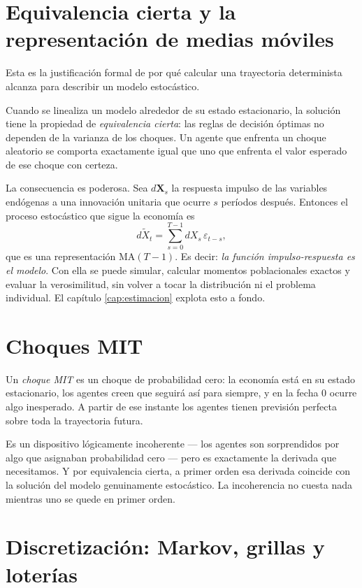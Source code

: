 \section{Equivalencia cierta y la representación de medias móviles}

Esta es la justificación formal de por qué calcular una trayectoria determinista
alcanza para describir un modelo estocástico.

Cuando se linealiza un modelo alrededor de su estado estacionario, la solución
tiene la propiedad de \emph{equivalencia cierta}: las reglas de decisión óptimas
no dependen de la varianza de los choques. Un agente que enfrenta un choque
aleatorio se comporta exactamente igual que uno que enfrenta el valor esperado
de ese choque con certeza.

La consecuencia es poderosa. Sea $d\mathbf{X}_s$ la respuesta impulso de las
variables endógenas a una innovación unitaria que ocurre $s$ períodos después.
Entonces el proceso estocástico que sigue la economía es
\begin{equation}
d\tilde{X}_t = \sum_{s=0}^{T-1} d X_s\, \varepsilon_{t-s},
\label{eq:ma}
\end{equation}
que es una representación $\mathrm{MA}(T-1)$. Es decir: \emph{la función
impulso-respuesta es el modelo}. Con ella se puede simular, calcular momentos
poblacionales exactos y evaluar la verosimilitud, sin volver a tocar la
distribución ni el problema individual. El capítulo \ref{cap:estimacion}
explota esto a fondo.

\section{Choques MIT}

Un \emph{choque MIT} es un choque de probabilidad cero: la economía está en su
estado estacionario, los agentes creen que seguirá así para siempre, y en la
fecha $0$ ocurre algo inesperado. A partir de ese instante los agentes tienen
previsión perfecta sobre toda la trayectoria futura.

Es un dispositivo lógicamente incoherente --- los agentes son sorprendidos por
algo que asignaban probabilidad cero --- pero es exactamente la derivada que
necesitamos. Y por equivalencia cierta, a primer orden esa derivada coincide con
la solución del modelo genuinamente estocástico. La incoherencia no cuesta nada
mientras uno se quede en primer orden.

\section{Discretización: Markov, grillas y loterías}

